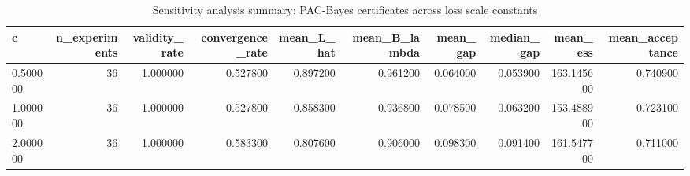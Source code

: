 \begin{table}
\caption{Sensitivity analysis summary: PAC-Bayes certificates across loss scale constants}
\label{tab:appendix_c_sensitivity}
\begin{tabular}{lrrrrrrrrr}
\toprule
c & n_experiments & validity_rate & convergence_rate & mean_L_hat & mean_B_lambda & mean_gap & median_gap & mean_ess & mean_acceptance \\
\midrule
0.500000 & 36 & 1.000000 & 0.527800 & 0.897200 & 0.961200 & 0.064000 & 0.053900 & 163.145600 & 0.740900 \\
1.000000 & 36 & 1.000000 & 0.527800 & 0.858300 & 0.936800 & 0.078500 & 0.063200 & 153.488900 & 0.723100 \\
2.000000 & 36 & 1.000000 & 0.583300 & 0.807600 & 0.906000 & 0.098300 & 0.091400 & 161.547700 & 0.711000 \\
\bottomrule
\end{tabular}
\end{table}
